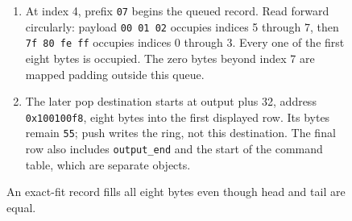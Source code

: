 \begin{figure}[htbp]
\begin{minipage}{\linewidth}
\begin{enumerate}
      \item At index 4, prefix \texttt{07} begins the queued record. Read forward circularly: payload \texttt{00 01 02} occupies indices 5 through 7, then \texttt{7f 80 fe ff} occupies indices 0 through 3. Every one of the first eight bytes is occupied. The zero bytes beyond index 7 are mapped padding outside this queue.
      \item The later pop destination starts at output plus 32, address \texttt{0x100100f8}, eight bytes into the first displayed row. Its bytes remain \texttt{55}; push writes the ring, not this destination. The final row also includes \texttt{output\_end} and the start of the command table, which are separate objects.
    \end{enumerate}
  \end{minipage}
  \caption{An exact-fit record fills all eight bytes even though head and tail are equal.}
  \label{capture:014-ring-buffer-logger-f02-full}
  \label{ring-f02-full}
\end{figure}
\par
